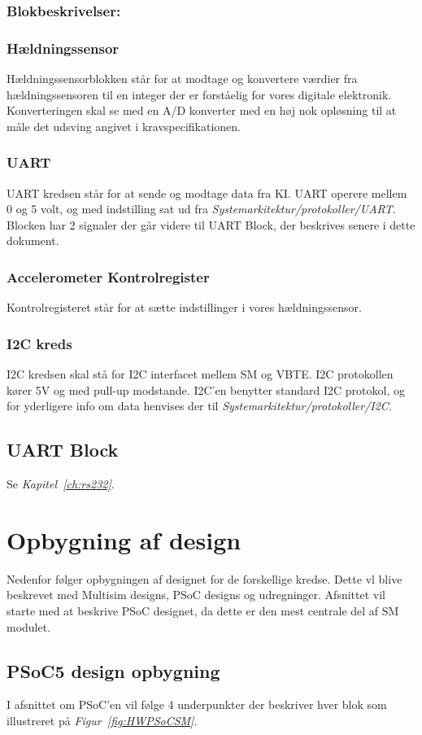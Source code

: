 \subsubsection{Blokbeskrivelser:}
\subsubsection{Hældningssensor}
Hældningssensorblokken står for at modtage og konvertere værdier fra hældningssensoren til en integer der er forståelig for vores digitale elektronik. Konverteringen skal se med en A/D konverter med en høj nok opløsning til at måle det udsving angivet i kravspecifikationen.
\subsubsection{UART}
UART kredsen står for at sende og modtage data fra KI. UART operere mellem 0 og 5 volt, og med indstilling sat ud fra \textit{Systemarkitektur/protokoller/UART}. Blocken har 2 signaler der går videre til UART Block, der beskrives senere i dette dokument. 
\subsubsection{Accelerometer Kontrolregister}
Kontrolregisteret står for at sætte indstillinger i vores hældningssensor.
\subsubsection{I2C kreds}
I2C kredsen skal stå for I2C interfacet mellem SM og VBTE. I2C protokollen kører 5V og med pull-up modstande. I2C'en benytter standard I2C protokol, og for yderligere info om data henvises der til \textit{Systemarkitektur/protokoller/I2C}.
\subsection{UART Block}
Se \textit{Kapitel~\ref{ch:rs232}}.
\section{Opbygning af design}
Nedenfor følger opbygningen af designet for de forskellige kredse. Dette vl blive beskrevet med Multisim designs, PSoC designs og udregninger. Afsnittet vil starte med at beskrive PSoC designet, da dette er den mest centrale del af SM modulet.
\subsection{PSoC5 design opbygning}
I afsnittet om PSoC'en vil følge 4 underpunkter der beskriver hver blok som illustreret på \textit{Figur~\ref{fig:HWPSoCSM}}.

